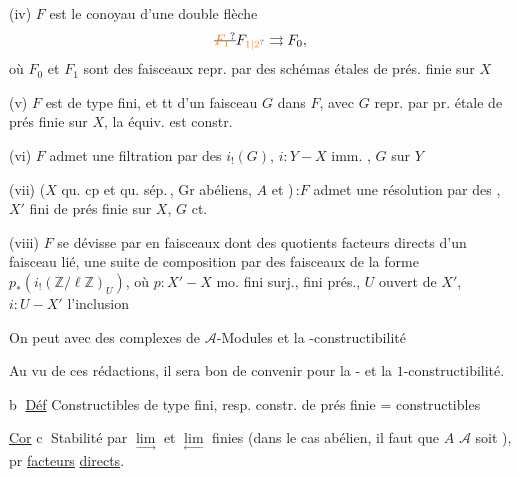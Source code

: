 (iv)  $F$ est le conoyau d'une double flèche
\[
\deleted{\unsure{F_1}} F_{\unsure{1|2}}\rightrightarrows F_0,
\]
où $F_0$ et $F_{1}$ sont des faisceaux repr. par des schémas étales de prés. finie sur $X$

(v)  $F$ est    de type fini, et tt  d'un faisceau  $G$ dans $F$, avec $G$ repr. par pr. étale de prés finie sur $X$,  la  équiv. est constr.

(vi)  $F$ admet une filtration par des $i_!(G)$, $i:Y-X$ imm.  , $G$  sur $Y$

(vii) ($X$ qu. cp et qu. sép.\,, Gr abéliens, $A$ et )\,:\enspace $F$ admet une  résolution  par des , $X'$ fini de prés finie sur $X$, $G$ ct. 


 (viii)  $F$ se dévisse par    en faisceaux  dont des quotients facteurs directs d'un faisceau lié,  une suite de composition par des faisceaux de la forme $p_*(i_!(\mathbb Z/\ell\mathbb Z)_U)$, où $p:X'-X$ mo. fini surj., fini   prés., $U$ ouvert  de $X'$, $i:U-X'$ l'inclusion

On peut  avec des complexes de $\mathcal A$-Modules et la -constructibilité

Au vu de ces rédactions, il sera bon de convenir pour la - et la $1$-constructibilité.

\textcircled{b} \uline{Déf} Constructibles de type fini, resp. constr. de prés finie = constructibles


\uline{Cor} \textcircled{c} Stabilité par $\underset{\longrightarrow}{\lim}$ et $\underset{\longleftarrow}{\lim}$ finies (dans le cas abélien, il faut  que $A$  $\mathcal A$ soit ), pr \uline{facteurs} \uline{directs}.

